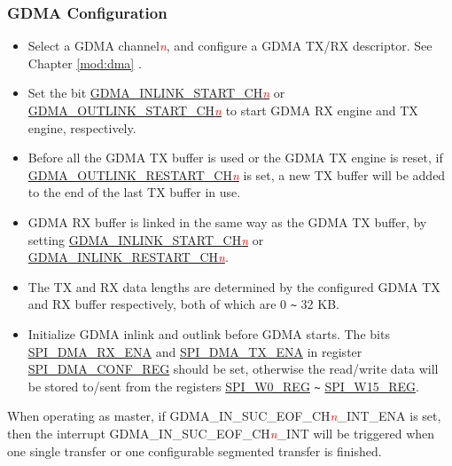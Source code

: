 \documentclass[main\_\_EN.tex]{subfiles}
\begin{document}
\subsubsection{GDMA Configuration}\label{sec:DMA-conf}


\begin{itemize}
    \item Select a GDMA channel\textcolor{red}{\it{n}}, and configure a GDMA TX/RX descriptor. See Chapter \ref{mod:dma} \textit{}.
    
    \item Set the bit \hyperref[fielddesc:GDMAINLINKSTARTCHN]{GDMA\_INLINK\_START\_CH\textcolor{red}{\it{n}}} or \hyperref[fielddesc:GDMAOUTLINKSTARTCHN]{GDMA\_OUTLINK\_START\_CH\textcolor{red}{\it{n}}} to start GDMA RX engine and TX engine, respectively. 

    \item Before all the GDMA TX buffer is used or the GDMA TX engine is reset, if  \hyperref[fielddesc:GDMAOUTLINKRESTARTCHN]{GDMA\_OUTLINK\_RESTART\_CH\textcolor{red}{\it{n}}} is set, a new TX buffer will be added to the end of the last TX buffer in use.
  
    \item GDMA RX buffer is linked in the same way as the GDMA TX buffer, by setting \hyperref[fielddesc:GDMAINLINKSTARTCHN]{GDMA\_INLINK\_START\_CH\textcolor{red}{\it{n}}} or \hyperref[fielddesc:GDMAINLINKRESTARTCHN]{GDMA\_INLINK\_RESTART\_CH\textcolor{red}{\it{n}}}.
  
    \item The TX and RX data lengths are determined by the configured GDMA TX and RX buffer respectively, both of which are 0 \verb+~+ 32 KB. 
  
    \item Initialize GDMA inlink and outlink before GDMA starts. The bits \hyperref[fielddesc:SPIDMARXENA]{SPI\_DMA\_RX\_ENA} and \hyperref[fielddesc:SPIDMATXENA]{SPI\_DMA\_TX\_ENA} in register \hyperref[regdesc:SPIDMACONFREG]{SPI\_DMA\_CONF\_REG} should be set, otherwise the read/write data will be stored to/sent from the registers \hyperref[regdesc:SPIW0REG]{SPI\_W0\_REG} \verb+~+ \hyperref[regdesc:SPIW0REG]{SPI\_W15\_REG}.
  
\end{itemize}

When operating as master, if GDMA\_IN\_SUC\_EOF\_CH\textcolor{red}{\it{n}}\_INT\_ENA is set, then the interrupt GDMA\_IN\_SUC\_EOF\_CH\textcolor{red}{\it{n}}\_INT will be triggered when one single transfer or one configurable segmented transfer is finished.
\end{document}

